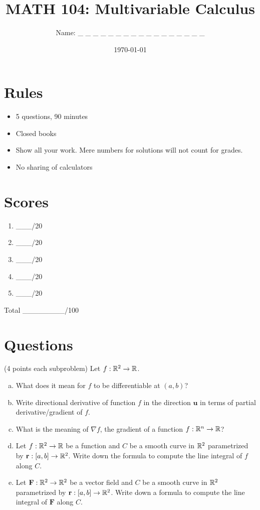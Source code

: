 \documentclass[12pt]{article}
\title{ MATH 104: Multivariable Calculus}
\author{Name: \_ \_ \_ \_ \_ \_ \_ \_ \_ \_ \_ \_ \_ \_ \_ \_ \_}
\date{\today}
\newcommand{\vect}{\mathbf}
\begin{document}
\maketitle

\section*{Rules}

\begin{itemize}
    \item 5 questions, 90 minutes
    \item Closed books
    \item Show all your work. Mere numbers for solutions will not count for grades.
    \item No sharing of calculators
\end{itemize}

\section*{Scores}

\begin{enumerate}[Problem 1.]
    \item  \_\_\_/20
    \item  \_\_\_/20
    \item \_\_\_/20
    \item  \_\_\_/20
    \item  \_\_\_/20
\end{enumerate}
Total \_\_\_\_\_\_\_\_/100


\newpage
\section*{Questions}

\begin{problem}
    (4 points each subproblem)
    Let $f:\mathbb{R}^2 \to \mathbb{R}$.
    \begin{enumerate}[(a)]
        \item  What does it mean for $f$ to be 
            differentiable at $(a,b)$?
        \item Write directional derivative of function $f$ in the direction $\textbf{u}$ in terms of partial derivative/gradient of $f$.
        \item What is the meaning of $\nabla f$, the gradient of a function $f:\mathbb{R}^n \to \mathbb{R}$?
        \item Let $f:\mathbb{R}^2 \to \mathbb{R}$ be a function and $C$ be a smooth curve in $\mathbb{R}^2$ parametrized by $\vect{r}:[a,b]\to \R^2$. Write down the formula to compute the line integral of $f$ along $C$.
        \item Let $\vect{F}:\R^2 \to \R^2$ be a vector field and $C$ be a smooth curve in $\mathbb{R}^2$ parametrized by $\vect{r}:[a,b]\to \R^2$. Write down a formula to compute the line integral of $\vect{F}$ along $C$.
    \end{enumerate}
\end{problem}
\end{document}
